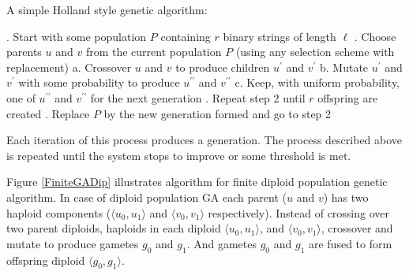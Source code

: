 A simple Holland style genetic algorithm:
\begin{algorithm}[h]
\caption*{}
\begin{algorithmic}[1]
. Start with some population $P$ containing $r$ binary strings of length $\ell$
. Choose parents $u$ and $v$ from the current population $P$ (using any selection scheme with replacement)
  \Statex \hspace{\algorithmicindent} a. Crossover $u$ and $v$ to produce children $u^\prime$ and $v^\prime$
  \Statex \hspace{\algorithmicindent} b. Mutate $u^\prime$ and $v^\prime$ with some probability to produce $u^{\prime\prime}$ and $v^{\prime\prime}$
  \Statex \hspace{\algorithmicindent} c. Keep, with uniform probability, one of $u^{\prime\prime}$ and $v^{\prime\prime}$ for the next generation 
. Repeat step 2 until $r$ offspring are created
. Replace $P$ by the new generation formed and go to step 2
\end{algorithmic}
\label{RealGA}
\end{algorithm}

Each iteration of this process produces a generation. 
The process described above is repeated until the system stops to improve or some threshold is met. 

Figure \ref{FiniteGADip} illustrates 
algorithm for finite diploid population genetic algorithm. 
In case of diploid population GA each parent ($u$ and $v$) 
has two haploid components ($\langle u_0, u_1 \rangle$ and $\langle v_0, v_1 \rangle$ respectively). 
Instead of crossing over two parent diploids, 
haploids in each diploid $\langle u_0, u_1 \rangle$, and $\langle v_0, v_1 \rangle$, 
crossover and mutate to produce gametes $g_0$ and $g_1$. 
And gametes $g_0$ and $g_1$ are fused to form offspring diploid $ \langle g_0, g_1 \rangle $.


